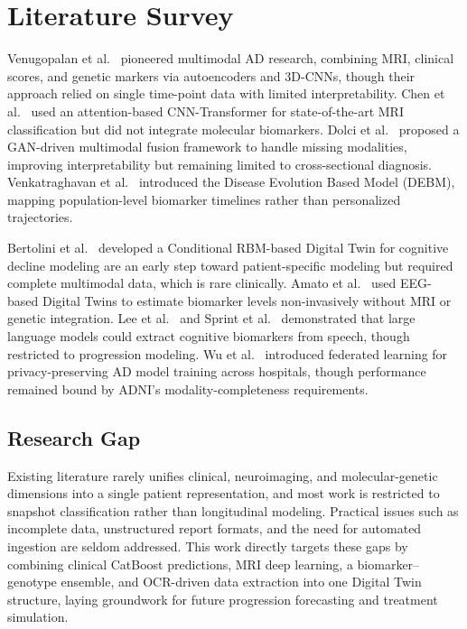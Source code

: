 \documentclass[conference]{IEEEtran}
\begin{document}
\section{Literature Survey}
Venugopalan et al.\ \cite{venugopalan2021} pioneered multimodal AD research, combining MRI, clinical scores, and genetic markers via autoencoders and 3D-CNNs, though their approach relied on single time-point data with limited interpretability. Chen et al.\ \cite{chen2022} used an attention-based CNN-Transformer for state-of-the-art MRI classification but did not integrate molecular biomarkers. Dolci et al.\ \cite{dolci2024} proposed a GAN-driven multimodal fusion framework to handle missing modalities, improving interpretability but remaining limited to cross-sectional diagnosis. Venkatraghavan et al.\ \cite{phd_debm} introduced the Disease Evolution Based Model (DEBM), mapping population-level biomarker timelines rather than personalized trajectories.

Bertolini et al.\ \cite{bertolini2021} developed a Conditional RBM-based Digital Twin for cognitive decline modeling are an early step toward patient-specific modeling but required complete multimodal data, which is rare clinically. Amato et al.\ \cite{amato2025} used EEG-based Digital Twins to estimate biomarker levels non-invasively without MRI or genetic integration. Lee et al.\ \cite{lee2023} and Sprint et al.\ \cite{sprint2024} demonstrated that large language models could extract cognitive biomarkers from speech, though restricted to progression modeling. Wu et al.\ \cite{wu2022} introduced federated learning for privacy-preserving AD model training across hospitals, though performance remained bound by ADNI's modality-completeness requirements.

\subsection{Research Gap}
Existing literature rarely unifies clinical, neuroimaging, and molecular-genetic dimensions into a single patient representation, and most work is restricted to snapshot classification rather than longitudinal modeling. Practical issues such as incomplete data, unstructured report formats, and the need for automated ingestion  are seldom addressed. This work directly targets these gaps by combining clinical CatBoost predictions, MRI deep learning, a biomarker--genotype ensemble, and OCR-driven data extraction into one Digital Twin structure, laying groundwork for future progression forecasting and treatment simulation.
\end{document}
